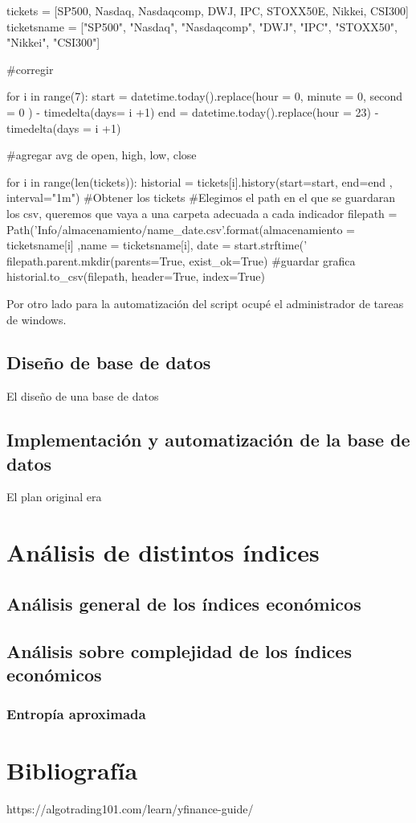 \documentclass[10pt,a4paper]{article}
\begin{document}
	\begin{python}
tickets = [SP500, Nasdaq, Nasdaqcomp, DWJ, IPC, STOXX50E, Nikkei, CSI300]
ticketsname = ["SP500", "Nasdaq", "Nasdaqcomp", "DWJ", "IPC", "STOXX50", "Nikkei", "CSI300"]

#corregir

for i in range(7):
    start = datetime.today().replace(hour = 0, minute = 0, second = 0 ) - timedelta(days= i +1)
    end = datetime.today().replace(hour = 23) - timedelta(days = i +1)

        #agregar avg de open, high, low, close


    for i in range(len(tickets)):
        historial = tickets[i].history(start=start, end=end , interval="1m") #Obtener los tickets
        #Elegimos el path en el que se guardaran los csv, queremos que vaya a una carpeta adecuada a cada indicador
        filepath = Path('Info/{almacenamiento}/{name}_{date}.csv'.format(almacenamiento = ticketsname[i] ,name = ticketsname[i], date = start.strftime('%
        filepath.parent.mkdir(parents=True, exist_ok=True)
        #guardar grafica
        historial.to_csv(filepath, header=True, index=True)	
	\end{python}	
	
	Por otro lado para la automatización del script ocupé el administrador de tareas de windows. 
	
		\subsection{Diseño de base de datos}
		
	El diseño de una base de datos
		
		\subsection{Implementación y automatización de la base de datos}
	
	El plan original era  
		
	
	
	
\section{Análisis de distintos índices}
	
	\subsection{Análisis general de los índices económicos}	
	
	
	\subsection{Análisis sobre complejidad de los índices económicos}
	\subsubsection{Entropía aproximada}
		
\section{Bibliografía}

	https://algotrading101.com/learn/yfinance-guide/
	
\end{document}
